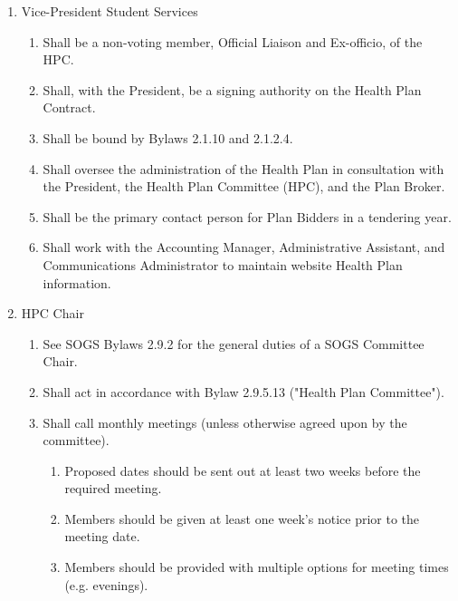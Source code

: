 \begin{enumerate} [label*=\arabic*., align=left]
\begin{enumerate} [label*=\arabic*., align=left]
\item Vice-President Student Services
\begin{enumerate}
\item Shall be a non-voting member, Official Liaison and Ex-officio, of the HPC.
\item Shall, with the President, be a signing authority on the Health Plan Contract.
\item Shall be bound by Bylaws 2.1.10 and 2.1.2.4.
\item Shall oversee the administration of the Health Plan in consultation with the President, the Health Plan Committee (HPC), and the Plan Broker.
\item Shall be the primary contact person for Plan Bidders in a tendering year.
\item Shall work with the Accounting Manager, Administrative Assistant, and Communications Administrator to maintain website Health Plan information.
\end{enumerate}
\item HPC Chair
\begin{enumerate}
\item See SOGS Bylaws 2.9.2 for the general duties of a SOGS Committee Chair.
\item Shall act in accordance with Bylaw 2.9.5.13 ("Health Plan Committee").
\item Shall call monthly meetings (unless otherwise agreed upon by the committee).
\begin{enumerate}
\item Proposed dates should be sent out at least two weeks before the required meeting.
\item Members should be given at least one week's notice prior to the meeting date.
\item Members should be provided with multiple options for meeting times (e.g.
evenings).
\end{enumerate}


\end{enumerate}
\end{enumerate}
\end{enumerate}
